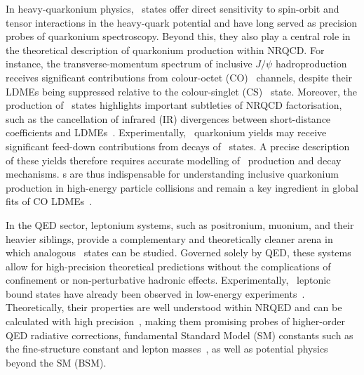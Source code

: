 In heavy-quarkonium physics, \pwavetxt\ states offer direct sensitivity to spin-orbit and tensor interactions in the heavy-quark potential and have long served as precision probes of quarkonium spectroscopy. Beyond this, they also play a central role in the theoretical description of quarkonium production within NRQCD. 
For instance, the transverse-momentum spectrum of inclusive $J/\psi$ hadroproduction receives significant contributions from colour-octet (CO) \pwavetxt\ channels, despite their LDMEs being suppressed relative to the colour-singlet (CS) \swavetxt\ state.
Moreover, the production of \pwavetxt\ states highlights important subtleties of NRQCD factorisation, such as the cancellation of infrared (IR) divergences between short-distance coefficients and LDMEs~\cite{Bodwin:1992ye,Bodwin:1994jh,Petrelli:1997ge,AH:2024ueu}.
Experimentally, \swavetxt\ quarkonium yields may receive significant feed-down contributions from decays of \pwavetxt\ states. A precise description of these yields therefore requires accurate modelling of \pwavetxt\ production and decay mechanisms.
{\pwavetxt}s are thus indispensable for understanding inclusive quarkonium production in high-energy particle collisions and remain a key ingredient in global fits of CO LDMEs~\cite{Ma:2010vd,Ma:2010yw,Butenschoen:2010rq,Ma:2010jj,Butenschoen:2011yh,Butenschoen:2012px,Chao:2012iv,Wang:2012is,Gong:2012ug,Shao:2012fs,Butenschoen:2012qr,Gong:2013qka,Shao:2014fca,Bodwin:2014gia,Shao:2014yta,Han:2014kxa,Feng:2015wka,Bodwin:2015iua,Feng:2018ukp,Feng:2020cvm,Brambilla:2021abf,Brambilla:2022rjd,Butenschoen:2022qka,Brambilla:2022ayc,Brambilla:2024iqg}.

In the QED sector, leptonium systems, such as positronium, muonium, and their heavier siblings, provide a complementary and theoretically cleaner arena in which analogous \pwavetxt\ states can be studied. Governed solely by QED, these systems allow for high-precision theoretical predictions without the complications of confinement or non-perturbative hadronic effects. Experimentally, \pwavetxt\ leptonic bound states have already been observed in low-energy experiments~\cite{PhysRevLett.34.177,PhysRevLett.102.133202}. Theoretically, their properties are well understood within NRQED and can be calculated with high precision~\cite{dEnterria:2022alo}, making them promising probes of higher-order QED radiative corrections, fundamental Standard Model (SM) constants such as the fine-structure constant and lepton masses~\cite{dEnterria:2023yao}, as well as potential physics beyond the SM (BSM).

